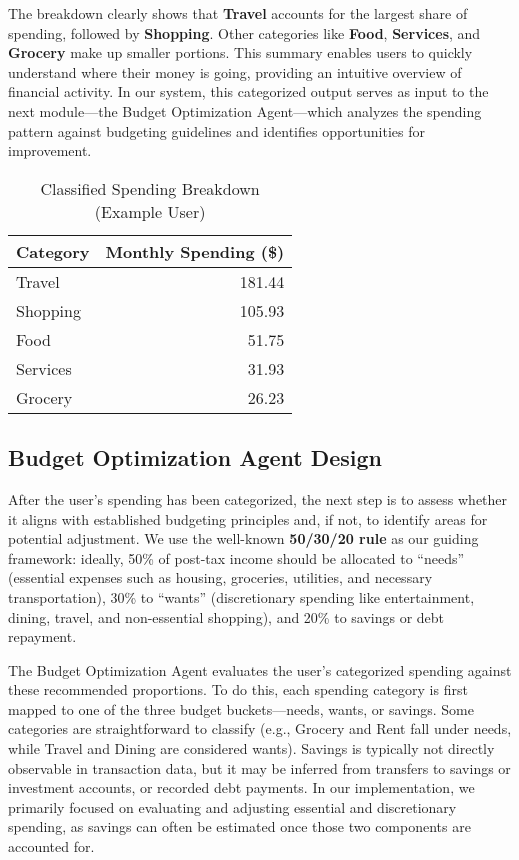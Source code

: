 \documentclass[conference]{IEEEtran}
\begin{document}
The breakdown clearly shows that \textbf{Travel} accounts for the largest share of spending, followed by \textbf{Shopping}. Other categories like \textbf{Food}, \textbf{Services}, and \textbf{Grocery} make up smaller portions. This summary enables users to quickly understand where their money is going, providing an intuitive overview of financial activity. In our system, this categorized output serves as input to the next module—the Budget Optimization Agent—which analyzes the spending pattern against budgeting guidelines and identifies opportunities for improvement.

\begin{table}[H]
\centering
\caption{Classified Spending Breakdown (Example User)}
\begin{tabular}{|l|r|}
\hline
\textbf{Category} & \textbf{Monthly Spending (\$)} \\
\hline
Travel & 181.44 \\
Shopping & 105.93 \\
Food & 51.75 \\
Services & 31.93 \\
Grocery & 26.23 \\
\hline
\end{tabular}
\label{tab:spending_breakdown}
\end{table}


\subsection{Budget Optimization Agent Design}
After the user’s spending has been categorized, the next step is to assess whether it aligns with established budgeting principles and, if not, to identify areas for potential adjustment. We use the well-known \textbf{50/30/20 rule} as our guiding framework: ideally, 50\% of post-tax income should be allocated to “needs” (essential expenses such as housing, groceries, utilities, and necessary transportation), 30\% to “wants” (discretionary spending like entertainment, dining, travel, and non-essential shopping), and 20\% to savings or debt repayment.

The Budget Optimization Agent evaluates the user’s categorized spending against these recommended proportions. To do this, each spending category is first mapped to one of the three budget buckets—needs, wants, or savings. Some categories are straightforward to classify (e.g., Grocery and Rent fall under needs, while Travel and Dining are considered wants). Savings is typically not directly observable in transaction data, but it may be inferred from transfers to savings or investment accounts, or recorded debt payments. In our implementation, we primarily focused on evaluating and adjusting essential and discretionary spending, as savings can often be estimated once those two components are accounted for.
\end{document}
